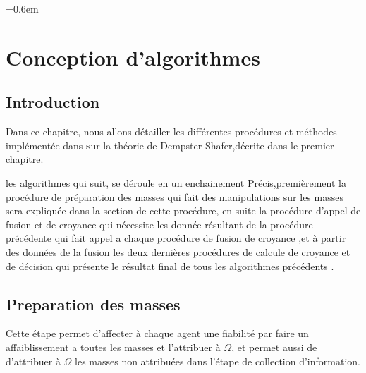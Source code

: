 \parskip=0.6em
\chapter{Conception d'algorithmes}


\section*{Introduction}

Dans ce chapitre, nous allons détailler les différentes procédures et méthodes implémentée dans \textbf sur la théorie de Dempster-Shafer,décrite dans le premier chapitre.

les algorithmes qui suit, se déroule en un enchainement Précis,premièrement la procédure de préparation des masses qui fait des manipulations sur les masses sera expliquée dans la section de cette procédure, en suite la procédure d'appel de fusion et de croyance qui nécessite les donnée résultant de la procédure précédente qui fait appel a chaque procédure de fusion de croyance ,et à partir des données de la fusion les deux dernières procédures de calcule de croyance et de décision qui présente le résultat final de tous les algorithmes précédents .
{}
\DontPrintSemicolon
\section{Preparation des masses}
Cette étape permet d'affecter à chaque agent une fiabilité par faire un affaiblissement a toutes les masses et l'attribuer à $\Omega$, et permet aussi de d'attribuer à $\Omega$ les masses non attribuées dans l'étape de collection d'information.   

